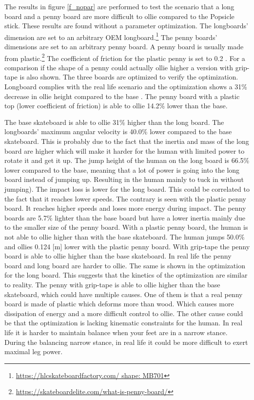 \documentclass[default,iicol]{sn-jnl}
\begin{document}
\noindent The results in figure \ref{f_nopar} are performed to test the scenario that a long board and a penny board are more difficult to ollie compared to the Popsicle stick. These results are found without a parameter optimization. The longboards' dimension are set to an arbitrary OEM longboard.\footnote{\url{https://hlcskateboardfactory.com/ shape: MB701}} The penny boards' dimensions are set to an arbitrary penny board. A penny board is usually made from plastic.\footnote{\url{https://skateboardelite.com/what-is-penny-board/}} The coefficient of friction for the plastic penny is set to 0.2 \cite{bani-hani_data_2019}. For a comparison if the shape of a penny could actually ollie higher a version with grip-tape is also shown. The three boards are optimized to verify the optimization. Longboard complies with the real life scenario and the optimization shows a 31\% decrease in ollie height compared to the base . The penny board with a plastic top (lower coefficient of friction) is able to ollie 14.2\% lower than the base.

The base skateboard is able to ollie 31\% higher than the long board. The longboards' maximum angular velocity is 40.0\% lower compared to the base skateboard. This is probably due to the fact that the inertia and mass of the long board are higher which will make it harder for the human with limited power to rotate it and get it up. The jump height of the human on the long board is 66.5\% lower compared to the base, meaning that a lot of power is going into the long board instead of jumping up. Resulting in the human mainly to tuck in without jumping). The impact loss is lower for the long board. This could be correlated to the fact that it reaches lower speeds. The contrary is seen with the plastic penny board. It reaches higher speeds and loses more energy during impact. The penny boards are 5.7\% lighter than the base board but have a lower inertia mainly due to the smaller size of the penny board. With a plastic penny board, the human is not able to ollie higher than with the base skateboard. The human jumps 50.0\% and ollies 0.124 [m] lower with the plastic penny board. With grip-tape the penny board is able to ollie higher than the base skateboard. In real life the penny board and long board are harder to ollie. The same is shown in the optimization for the long board. This suggests that the kinetics of the optimization are similar to reality. The penny with grip-tape is able to ollie higher than the base skateboard, which could have multiple causes. One of them is that a real penny board is made of plastic which deforms more than wood. Which causes more dissipation of energy and a more difficult control to ollie. The other cause could be that the optimization is lacking kinematic constraints for the human. In real life it is harder to maintain balance when your feet are in a narrow stance. During the balancing narrow stance, in real life it could be more difficult to exert maximal leg power.
\end{document}

